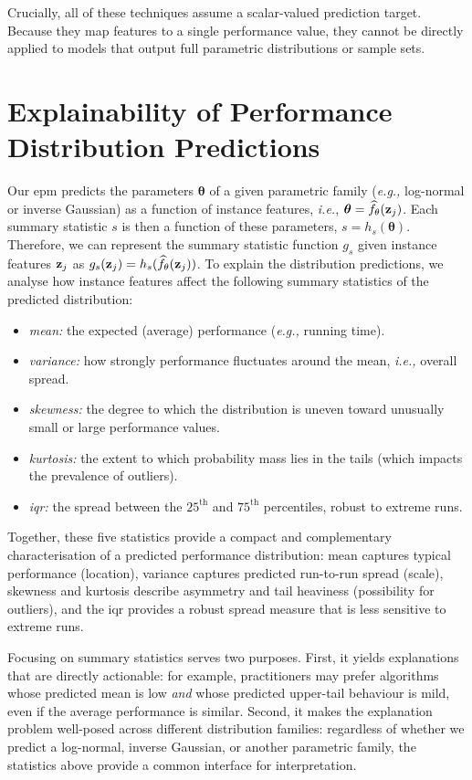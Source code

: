 Crucially, all of these techniques assume a scalar-valued prediction target. Because they map features to a single performance value, they cannot be directly applied to models that output full parametric distributions or sample sets.

\section{Explainability of Performance Distribution Predictions}
\label{sec:ch09:explainability}

Our \gls{epm} predicts the parameters $\boldsymbol\theta$ of a given parametric family (\emph{e.g.,} log-normal or inverse Gaussian) as a function of instance features, \emph{i.e.}, $\boldsymbol\theta=\widehat f_{\theta}(\mathbf{z}_j)$. Each summary statistic $s$ is then a function of these parameters, $s=h_s(\boldsymbol\theta)$.
Therefore, we can represent the summary statistic function $g_s$ given instance features $\mathbf{z}_j$ as
$g_s(\mathbf{z}_j) = h_s(\widehat f_{\theta}(\mathbf{z}_j))$.
To explain the distribution predictions, we analyse how instance features affect the following summary statistics of the predicted distribution:
\begin{itemize}
    \item \emph{mean:} the expected (average) performance (\emph{e.g.,} running time).
    \item \emph{variance:} how strongly performance fluctuates around the mean, \emph{i.e.,} overall spread.
    \item \emph{skewness:} the degree to which the distribution is uneven toward unusually small or large performance values.
    \item \emph{kurtosis:} the extent to which  probability mass lies in the tails (which impacts the prevalence of outliers).
    \item \emph{\gls{iqr}:} the spread between the $25^{\mathrm{th}}$ and $75^{\mathrm{th}}$ percentiles, robust to extreme runs.
\end{itemize}
Together, these five statistics provide a compact and complementary characterisation of a predicted performance distribution: mean captures typical performance (location), variance captures predicted run-to-run spread (scale), skewness and kurtosis describe asymmetry and tail heaviness (possibility for outliers), and the \gls{iqr} provides a robust spread measure that is less sensitive to extreme runs.

Focusing on summary statistics serves two purposes. First, it yields explanations that are directly actionable: for example, practitioners may prefer algorithms whose predicted mean is low \emph{and} whose predicted upper-tail behaviour is mild, even if the average performance is similar. Second, it makes the explanation problem well-posed across different distribution families: regardless of whether we predict a log-normal, inverse Gaussian, or another parametric family, the statistics above provide a common interface for interpretation.


